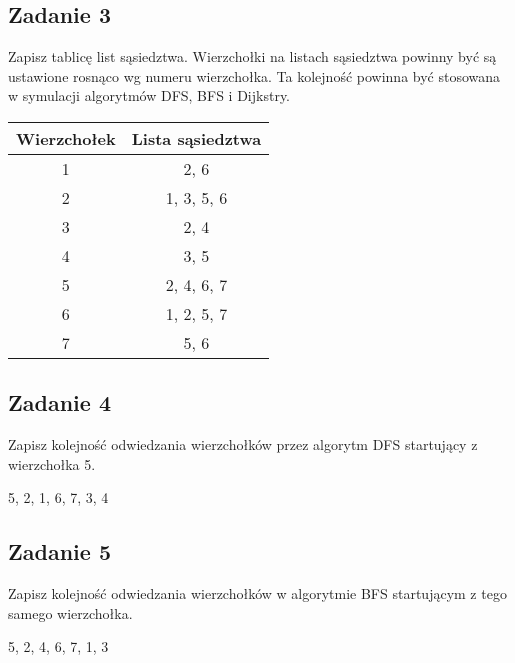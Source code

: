\documentclass{article}
\begin{document}
\subsection*{Zadanie 3}
Zapisz tablicę list sąsiedztwa. Wierzchołki na listach sąsiedztwa powinny być są ustawione
rosnąco wg numeru wierzchołka. Ta kolejność powinna być stosowana w symulacji algorytmów DFS, BFS i Dijkstry.
\begin{center}
    \begin{tabular}{|c|c|}
        \hline
        Wierzchołek & Lista sąsiedztwa \\
        \hline
        1           & 2, 6             \\
        \hline
        2           & 1, 3, 5, 6       \\
        \hline
        3           & 2, 4             \\
        \hline
        4           & 3, 5             \\
        \hline
        5           & 2, 4, 6, 7       \\
        \hline
        6           & 1, 2, 5, 7       \\
        \hline
        7           & 5, 6             \\
        \hline
    \end{tabular}
\end{center}

\pagebreak
\subsection*{Zadanie 4}
Zapisz kolejność odwiedzania wierzchołków przez algorytm DFS startujący z wierzchołka 5.
\begin{center}
    5, 2, 1, 6, 7, 3, 4
\end{center}

\subsection*{Zadanie 5}
Zapisz kolejność odwiedzania wierzchołków w algorytmie BFS startującym z tego samego
wierzchołka.
\begin{center}
    5, 2, 4, 6, 7, 1, 3
\end{center}
\end{document}
